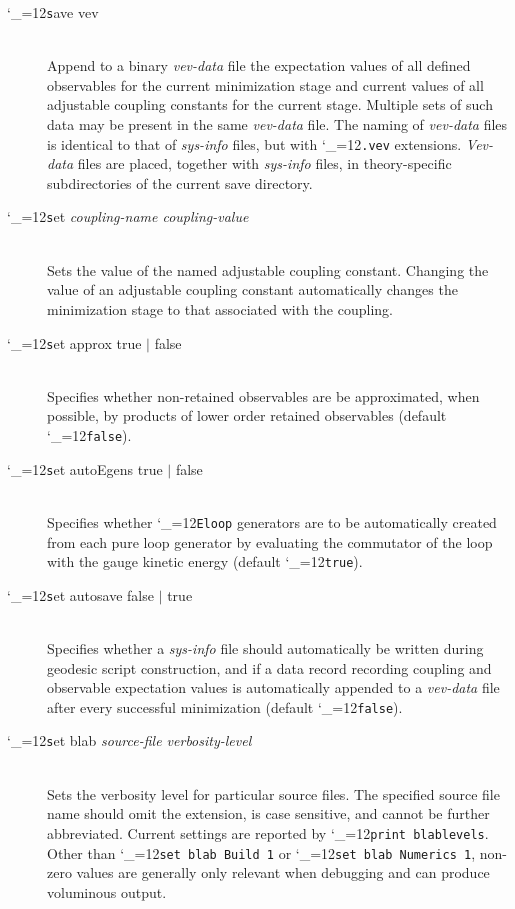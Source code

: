 \documentclass [12pt]{article}
\makeatletter
\renewcommand{\tt}{\begingroup\catcode`_=12\def\_{\string_}\tt@}
\newcommand{\tt@}[1]{\texttt{#1}\endgroup}
\makeatother
\begin{document}
\begin{description}
\item [\tt save vev]~\\
    Append to a binary \textit{vev-data} file the expectation
    values of all defined observables for the current minimization stage
    and current values of all adjustable coupling constants for the current stage.
    Multiple sets of such data may be present
    in the same \textit{vev-data} file.
    The naming of \textit{vev-data} files is identical to that of
    \textit{sys-info} files, but with \tt{.vev} extensions.
    \textit{Vev-data} files are placed, together with \textit{sys-info} files,
    in theory-specific subdirectories of the current save directory.

\item [\tt set {\it coupling-name coupling-value}]~\\
    Sets the value of the named adjustable coupling constant.
    Changing the value of an adjustable coupling constant
    automatically changes the minimization stage to that
    associated with the coupling.

\item [\tt set approx true $\vert$ false]~\\
    Specifies whether non-retained observables are
    be approximated, when possible, by products of
    lower order retained observables (default \tt{false}).

\item [\tt set autoEgens true $\vert$ false]~\\
    Specifies whether 
    \tt{Eloop} generators are to be automatically
    created from each pure loop generator by
    evaluating the commutator of the loop with
    the gauge kinetic energy
    (default \tt{true}).

\item [\tt set autosave false $\vert$ true]~\\
    Specifies whether a \textit{sys-info} file should automatically be
    written during geodesic script
    construction, and if a data record recording
    coupling and observable expectation values is automatically appended
    to a \textit{vev-data} file after every successful minimization
    (default \tt{false}).

\item [\tt set blab {\it source-file verbosity-level}]~\\
    Sets the verbosity level for particular source files.
    The specified source file name should omit the
    extension, is case sensitive, and cannot be further abbreviated.
    Current settings are reported by \tt{print blablevels}.
    Other than \tt{set blab Build 1} or \tt{set blab Numerics 1},
    non-zero values are generally only relevant when
    debugging and can produce voluminous output.


\end{description}
\end{document}
